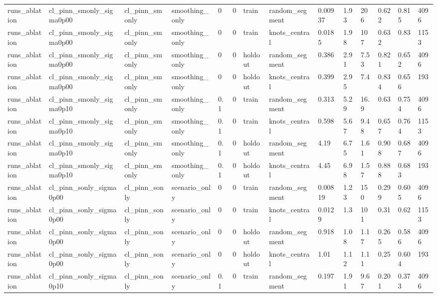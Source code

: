 \begin{table}[t]
\begin{tabular}{llllllllllllll}
runs\_ablation & cl\_pinn\_smonly\_sigma0p00 & cl\_pinn\_smonly & smoothing\_only & 0 & 0 & train & random\_segment & 0.00937 & 1.93 & 206 & 0.622 & 0.815 & 4096 \\
runs\_ablation & cl\_pinn\_smonly\_sigma0p00 & cl\_pinn\_smonly & smoothing\_only & 0 & 0 & train & knots\_central & 0.0185 & 1.98 & 107 & 0.632 & 0.83 & 1153 \\
runs\_ablation & cl\_pinn\_smonly\_sigma0p00 & cl\_pinn\_smonly & smoothing\_only & 0 & 0 & holdout & random\_segment & 0.386 & 2.91 & 7.53 & 0.821 & 0.652 & 4096 \\
runs\_ablation & cl\_pinn\_smonly\_sigma0p00 & cl\_pinn\_smonly & smoothing\_only & 0 & 0 & holdout & knots\_central & 0.399 & 2.95 & 7.4 & 0.834 & 0.656 & 193 \\
runs\_ablation & cl\_pinn\_smonly\_sigma0p10 & cl\_pinn\_smonly & smoothing\_only & 0.1 & 0 & train & random\_segment & 0.313 & 5.29 & 16.9 & 0.63 & 0.754 & 4096 \\
runs\_ablation & cl\_pinn\_smonly\_sigma0p10 & cl\_pinn\_smonly & smoothing\_only & 0.1 & 0 & train & knots\_central & 0.598 & 5.67 & 9.48 & 0.657 & 0.764 & 1153 \\
runs\_ablation & cl\_pinn\_smonly\_sigma0p10 & cl\_pinn\_smonly & smoothing\_only & 0.1 & 0 & holdout & random\_segment & 4.19 & 6.75 & 1.61 & 0.908 & 0.687 & 4096 \\
runs\_ablation & cl\_pinn\_smonly\_sigma0p10 & cl\_pinn\_smonly & smoothing\_only & 0.1 & 0 & holdout & knots\_central & 4.45 & 6.98 & 1.57 & 0.888 & 0.683 & 193 \\
runs\_ablation & cl\_pinn\_sonly\_sigma0p00 & cl\_pinn\_sonly & scenario\_only & 0 & 0 & train & random\_segment & 0.00819 & 1.23 & 150 & 0.299 & 0.605 & 4096 \\
runs\_ablation & cl\_pinn\_sonly\_sigma0p00 & cl\_pinn\_sonly & scenario\_only & 0 & 0 & train & knots\_central & 0.0129 & 1.3 & 101 & 0.31 & 0.62 & 1153 \\
runs\_ablation & cl\_pinn\_sonly\_sigma0p00 & cl\_pinn\_sonly & scenario\_only & 0 & 0 & holdout & random\_segment & 0.918 & 1.08 & 1.17 & 0.265 & 0.586 & 4096 \\
runs\_ablation & cl\_pinn\_sonly\_sigma0p00 & cl\_pinn\_sonly & scenario\_only & 0 & 0 & holdout & knots\_central & 1.01 & 1.12 & 1.11 & 0.25 & 0.604 & 193 \\
runs\_ablation & cl\_pinn\_sonly\_sigma0p10 & cl\_pinn\_sonly & scenario\_only & 0.1 & 0 & train & random\_segment & 0.197 & 1.91 & 9.67 & 0.201 & 0.373 & 4096 \\

\end{tabular}
\end{table}
